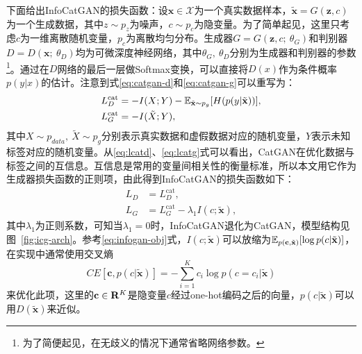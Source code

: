 下面给出InfoCatGAN的损失函数：设$\mathbf{x} \in \mathcal{X}$为一个真实数据样本，$\tilde{\mathbf{x}} = G(\mathbf{z}, c)$为一个生成数据，其中$z\sim p_z$为噪声，$c\sim p_c$为隐变量。为了简单起见，这里只考虑$c$为一维离散随机变量，$p_c$为离散均匀分布。生成器$G = G(\mathbf{z}, c; ~\theta_G)$和判别器$D = D(\mathbf{x}; ~\theta_D)$均为可微深度神经网络，其中$\theta_G, ~\theta_D$分别为生成器和判别器的参数\footnote{为了简便起见，在无歧义的情况下通常省略网络参数。}。通过在$D$网络的最后一层做Softmax变换，可以直接将$D(x)$作为条件概率$p(y|x)$的估计。注意到式\eqref{eq:catgan-d}和\eqref{eq:catgan-g}可以重写为：
\begin{align}
  L_D^{\text{cat}} &= -I(X;Y)-
         \mathbb{E}_{\tilde{\mathbf{x}} \sim p_g}[H(p(y|\tilde{\mathbf{x}}))], \label{eq:lcatd} \\
  L_G^{\text{cat}} &= -I(\tilde{X}; Y), \label{eq:lcatg}
\end{align}
其中$X \sim p_{data}, ~\tilde{X} \sim p_g$分别表示真实数据和虚假数据对应的随机变量，$Y$表示未知标签对应的随机变量。从\eqref{eq:lcatd}、\eqref{eq:lcatg}式可以看出，CatGAN在优化数据与标签之间的互信息。互信息是常用的变量间相关性的衡量标准，所以本文用它作为生成器损失函数的正则项，由此得到InfoCatGAN的损失函数如下：
\begin{equation}
\label{eq:infocatgan}
\begin{split}
  L_D &= L_D^{\text{cat}}, \\ 
  L_G &= L_G^{\text{cat}} - \lambda_1 I(c; \tilde{\mathbf{x}}),
\end{split}
\end{equation}
其中$\lambda_1$为正则系数，可知当$\lambda_1 = 0$时，InfoCatGAN退化为CatGAN，模型结构见图~\ref{fig:icg-arch}。参考\eqref{eq:infogan-obj}式，$I(c; \tilde{\mathbf{x}})$可以放缩为$\mathbb{E}_{p(\mathbf{c},\tilde{\mathbf{x}})}[\log p(c|\tilde{\mathbf{x}})]$，在实现中通常使用交叉熵
\begin{equation}
  CE[\mathbf{c}, p(c|\tilde{\mathbf{x}})] = -\sum_{i=1}^K c_i \log p(c=c_i | \tilde{\mathbf{x}})
\end{equation}
来优化此项，这里的$\mathbf{c} \in \mathbf{R}^K$是隐变量$c$经过one-hot编码之后的向量，$p(c|\tilde{\mathbf{x}})$可以用$D(\tilde{\mathbf{x}})$来近似。

